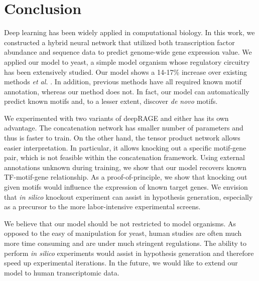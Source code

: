 \documentclass{article}
\begin{document}
\section{Conclusion}

Deep learning has been widely applied in computational biology. In this work, we constructed a hybrid neural network that utilized both transcription factor abundance and sequence data to predict genome-wide gene expression value. We applied our model to yeast, a simple model organism whose regulatory circuitry has been extensively studied. Our model shows a 14-17\% increase over existing methods \textit{et al.} \cite{Kundaje:2007hs,Ruan:2006hl}. In addition, previous methods have all required known motif annotation, whereas our method does not. In fact, our model can automatically predict known motifs and, to a lesser extent, discover \textit{de novo} motifs. 

We experimented with two variants of deepRAGE and either has its own advantage. The concatenation network has smaller number of parameters and thus is faster to train. On the other hand, the tensor product network allows easier interpretation. In particular, it allows knocking out a specific motif-gene pair, which is not feasible within the concatenation framework. 
Using external annotations unknown during training, we show that our model recovers known TF-motif-gene relationship. As a proof-of-principle, we show that knocking out given motifs would influence the expression of known target genes. We envision that \textit{in silico} knockout experiment can assist in hypothesis generation, especially as a precursor to the more labor-intensive experimental screens. 

We believe that our model should be not restricted to model organisms. As opposed to the easy of manipulation for yeast, human studies are often much more time consuming and are under much stringent regulations. The ability to perform \textit{in silico} experiments would assist in hypothesis generation and therefore speed up experimental iterations. In the future, we would like to extend our model to human transcriptomic data. 




\end{document}
